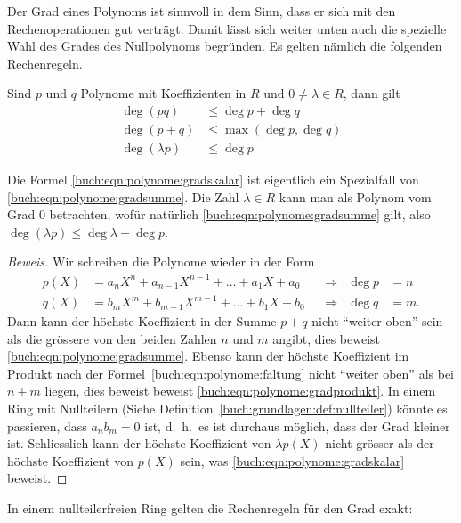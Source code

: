 Der Grad eines Polynoms ist sinnvoll in dem Sinn, dass er sich mit
den Rechenoperationen gut verträgt.
Damit lässt sich weiter unten auch die spezielle Wahl des Grades
des Nullpolynoms begründen.
Es gelten nämlich die folgenden Rechenregeln.

\begin{lemma}
\label{lemma:rechenregelnfuerpolynomgrad}
Sind $p$ und $q$ Polynome mit Koeffizienten in $R$ und $0\ne \lambda\in R$,
dann gilt
\begin{align}
\deg(pq) &\le \deg p + \deg q
\label{buch:eqn:polynome:gradsumme}
\\
\deg(p+q) &\le \max(\deg p, \deg q)
\label{buch:eqn:polynome:gradprodukt}
\\
\deg(\lambda p) &\le \deg p
\label{buch:eqn:polynome:gradskalar}
\end{align}
\end{lemma}

Die Formel \eqref{buch:eqn:polynome:gradskalar} ist eigentlich
ein Spezialfall von \eqref{buch:eqn:polynome:gradsumme}.
Die Zahl $\lambda\in R$ kann man als Polynom vom Grad $0$ betrachten,
wofür natürlich \eqref{buch:eqn:polynome:gradsumme} gilt, also
$\deg(\lambda p) \le \deg\lambda + \deg p$.

\begin{proof}[Beweis]
Wir schreiben die Polynome wieder in der Form
\[
\begin{aligned}
p(X) &= a_nX^n + a_{n-1}X^{n-1} + \dots + a_1X + a_0&&\Rightarrow&\deg p&=n\\
q(X) &= b_mX^m + b_{m-1}X^{m-1} + \dots + b_1X + b_0&&\Rightarrow&\deg q&=m.
\end{aligned}
\]
Dann kann der höchste Koeffizient in der Summe $p+q$ nicht ``weiter oben''
sein als die grössere von den beiden Zahlen $n$ und $m$ angibt, dies
beweist \eqref{buch:eqn:polynome:gradsumme}.
Ebenso kann der höchste Koeffizient im Produkt nach der
Formel~\eqref{buch:eqn:polynome:faltung} nicht ``weiter oben'' als bei
$n+m$ liegen, dies beweist
beweist \eqref{buch:eqn:polynome:gradprodukt}.
In einem Ring mit Nullteilern
(Siehe Definition~\ref{buch:grundlagen:def:nullteiler})
könnte es passieren, dass $a_nb_m=0$ ist, d.~h.~es ist durchaus möglich,
dass der Grad kleiner ist.
Schliesslich kann der höchste Koeffizient von $\lambda p(X)$ nicht grösser
als der höchste Koeffizient von $p(X)$ sein, was
\eqref{buch:eqn:polynome:gradskalar} beweist.
\end{proof}

In einem nullteilerfreien Ring gelten die Rechenregeln für den Grad exakt:

